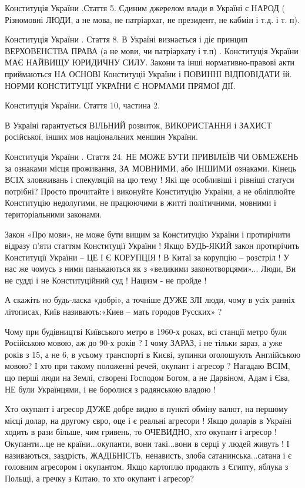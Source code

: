 \begin{itemize}
Конституція України .Стаття 5. Єдиним джерелом влади в Україні є НАРОД (
Різномовні ЛЮДИ, а не мова, не патріархат, не президент, не кабмін і т.д. і т.
п).

Конституція України . Стаття 8. В Україні визнається і діє принцип ВЕРХОВЕНСТВА
ПРАВА (а не мови, чи патріархату і т.п) . Конституція України МАЄ НАЙВИЩУ
ЮРИДИЧНУ СИЛУ. Закони та інші нормативно-правові акти приймаються НА ОСНОВІ
Конституції України і ПОВИННІ ВІДПОВІДАТИ їй. НОРМИ КОНСТИТУЦІЇ УКРАЇНИ Є
НОРМАМИ ПРЯМОЇ ДІЇ.

Конституція України. Стаття 10, частина 2.

В Україні гарантується ВІЛЬНИЙ розвиток, ВИКОРИСТАННЯ і ЗАХИСТ російської, інших мов національних меншин України.

Конституція України . Стаття 24. НЕ МОЖЕ БУТИ ПРИВІЛЕЇВ ЧИ ОБМЕЖЕНЬ за ознаками
місця проживання, ЗА МОВНИМИ, або ІНШИМИ ознаками. Кінець ВСІХ зловживань і
спекуляцій на цю тему ! Які ще особливіші і рівніші статуси потрібні? Просто
прочитайте і виконуйте Конституцію України, а не обліплюйте Конституцію
недолугими, не працюючими в житті політичними, мовними і територіальними
законами.

Закон «Про мови», не може бути вищим за Конституцію України і протирічити
відразу п’яти статтям Конституції України ! Якщо БУДЬ-ЯКИЙ закон протирічить
Конституції України – ЦЕ І Є КОРУПЦІЯ ! В Китаї за корупцію – розстріл ! У нас
же чомусь з ними панькаються як з «великими законотворцями»... Люди, Ви не судді
і не Конституційний суд ! Нацизм - не пройде !

А скажіть но будь-ласка «добрі», а точніше ДУЖЕ ЗЛІ люди, чому в усіх ранніх
літописах, Київ називають:«Киев – мать городов Русских» ? 

Чому при будівництві Київського метро в 1960-х роках, всі станції метро були
Російською мовою, аж до 90-х років ? І чому ЗАРАЗ, і не тільки зараз, а уже
років з 15, а не 6, в усьому транспорті в Києві, зупинки оголошують Англійською
мовою? І хто при такому положенні речей, окупант і агресор ? Нагадаю ВСІМ, що
перші люди на Землі, створені Господом Богом, а не Дарвіном, Адам і Єва, НЕ
були Українцями, і не боролися з радянською владою ! 

Хто окупант і агресор ДУЖЕ добре видно в пункті обміну валют, на першому місці
долар, на другому євро, оце і є реальні агресори ! Якщо доларів в Україні
ходить в рази більше, чим гривень, то ОЧЕВИДНО, хто окупант і агресор !
Окупанти...це не країни...окупанти, вони такі...вони в серці у людей живуть ! І
називаються, заздрість, ЖАДІБНІСТЬ, ненависть, злоба сатанинська...сатана і є
головним агресором і окупантом. Якщо картоплю продають з Єгипту, яблука з
Польщі, а гречку з Китаю, то хто окупант і агресор? 


\end{itemize}
